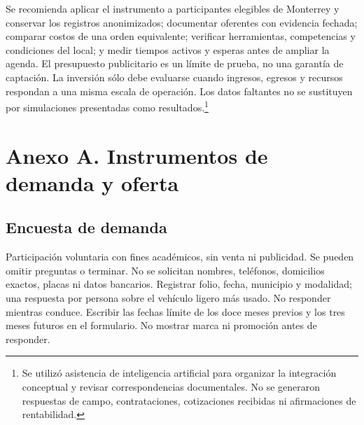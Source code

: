 {Se recomienda aplicar el instrumento a participantes elegibles de Monterrey y conservar los registros anonimizados; documentar oferentes con evidencia fechada; comparar costos de una orden equivalente; verificar herramientas, competencias y condiciones del local; y medir tiempos activos y esperas antes de ampliar la agenda. El presupuesto publicitario es un límite de prueba, no una garantía de captación. La inversión sólo debe evaluarse cuando ingresos, egresos y recursos respondan a una misma escala de operación. Los datos faltantes no se sustituyen por simulaciones presentadas como resultados.\footnote{Se utilizó asistencia de inteligencia artificial para organizar la integración conceptual y revisar correspondencias documentales. No se generaron respuestas de campo, contrataciones, cotizaciones recibidas ni afirmaciones de rentabilidad.}
\clearpage
\section*{Anexo A. Instrumentos de demanda y oferta}
\subsection*{Encuesta de demanda}
Participación voluntaria con fines académicos, sin venta ni publicidad. Se pueden omitir preguntas o terminar. No se solicitan nombres, teléfonos, domicilios exactos, placas ni datos bancarios. Registrar folio, fecha, municipio y modalidad; una respuesta por persona sobre el vehículo ligero más usado. No responder mientras conduce. Escribir las fechas límite de los doce meses previos y los tres meses futuros en el formulario. No mostrar marca ni promoción antes de responder.

}
